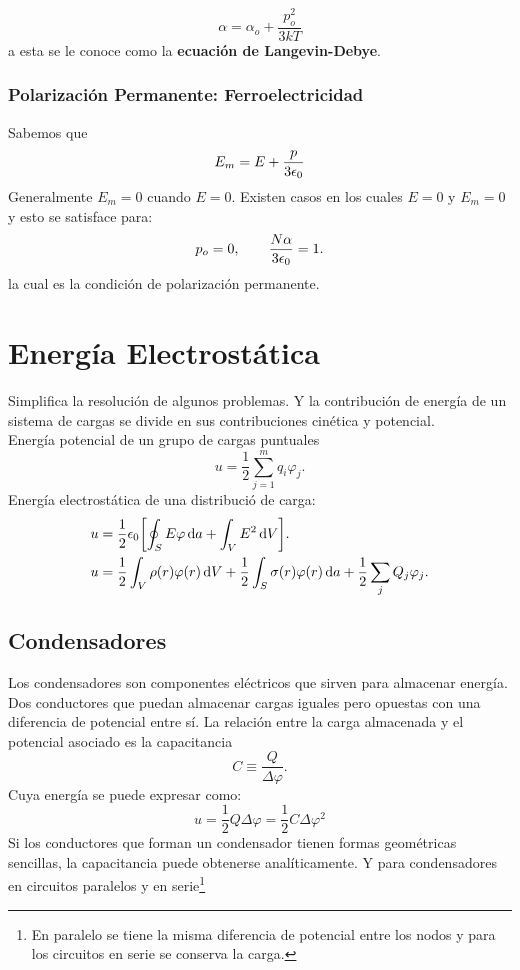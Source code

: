 \begin{equation}
	\alpha = \alpha _o + \frac{p_o ^2}{3kT}
\end{equation}
a esta se le conoce como la \textbf{ecuación de Langevin-Debye}.

\subsection{Polarización Permanente: Ferroelectricidad}
Sabemos que
\begin{equation}
	E_m = E + \frac{p}{3\epsilon_0}
\end{equation}
Generalmente $E_m = 0$ cuando $E = 0$. Existen casos en los cuales $E = 0$ y $E_m = 0$ y esto se satisface para:
\begin{equation}
	p_o = 0, \qquad \frac{N \alpha}{3\epsilon_0} = 1.
\end{equation}
la cual es la condición de polarización permanente.






\chapter{Energía Electrostática}
Simplifica la resolución de algunos problemas. Y la contribución de energía de un sistema de cargas se divide en sus contribuciones cinética y potencial. \\
Energía potencial de un grupo de cargas puntuales
\begin{equation}
	u = \frac{1}{2} \sum _{j=1} ^{m} q_i \varphi _j.
\end{equation}
Energía electrostática de una distribució de carga:
\begin{align*}
	u &= \frac{1}{2} \epsilon_0 \qty[\oint _S E\varphi \dd{a} + \int _V E^2 \dd{V}]. \\
	u &= \frac{1}{2} \int _V \rho (r) \varphi (r) \dd{V} + \frac{1}{2} \int _S \sigma (r) \varphi (r) \dd{a} + \frac{1}{2} \sum _j Q_j \varphi _j.
\end{align*}



\section{Condensadores}
Los condensadores son componentes eléctricos que sirven para almacenar energía. Dos conductores que puedan almacenar cargas iguales pero opuestas con una diferencia de potencial entre sí. La relación entre la carga almacenada y el potencial asociado es la capacitancia
\begin{equation}
	C \equiv \frac{Q}{\Delta \varphi}.
\end{equation}
Cuya energía se puede expresar como:
\begin{equation}
	u = \frac{1}{2} Q \Delta \varphi = \frac{1}{2} C \Delta \varphi ^2
\end{equation}
Si los conductores que forman un condensador tienen formas geométricas sencillas, la capacitancia puede obtenerse analíticamente. Y para condensadores en circuitos paralelos y en serie\footnote{En paralelo se tiene la misma diferencia de potencial entre los nodos y para los circuitos en serie se conserva la carga.}

